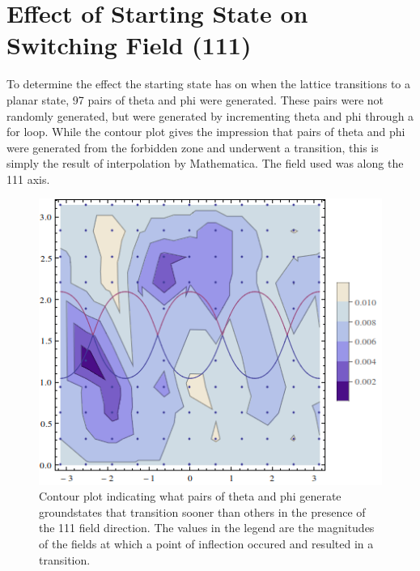 \documentclass{article}
\begin{document}
\section{Effect of Starting State on Switching Field (111)}
To determine the effect the starting state has on when the lattice transitions to a planar state, 97 pairs of
theta and phi were generated. These pairs were not randomly generated, but were generated by incrementing theta and phi
through a for loop. While the contour plot gives the impression that pairs of theta and phi were generated from the 
forbidden zone and underwent a transition, this is simply the result of interpolation by Mathematica. The field used
was along the 111 axis.
\begin{figure}[ht]
 \centering
 \includegraphics[scale=0.76]{97pheta/3DswitchingfieldContour.png}
 \caption{Contour plot indicating what pairs of theta and phi generate groundstates that transition sooner than others
 in the presence of the 111 field direction. The values in the legend are the magnitudes of the fields at which a
 point of inflection occured and resulted in a transition.}
\end{figure}
\clearpage
\end{document}
